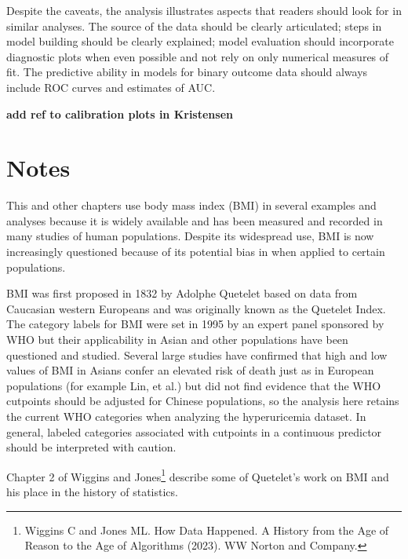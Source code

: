 Despite the caveats, the analysis illustrates aspects that readers should look for in similar analyses. The source of the data should be clearly articulated; steps in model building should be clearly explained; model evaluation should incorporate diagnostic plots when even possible and not rely on only numerical  measures of fit.  The predictive ability in models for binary outcome data should always include ROC curves and estimates of AUC.

\textbf{add ref to calibration plots in Kristensen} 



\textD{\newpage}

\section{Notes}
\label{notesLogisticRegression}

This and other chapters use body mass index (BMI) in several examples and analyses because it is widely available and has been measured and recorded in many studies of human populations. Despite its widespread use, BMI is now increasingly questioned because of its potential bias in when applied to certain populations.

BMI was first proposed in 1832 by Adolphe Quetelet based on data from Caucasian western Europeans and was originally known as the Quetelet Index. The category labels for BMI were set in 1995 by an expert panel sponsored by WHO but their applicability in Asian and other populations have been questioned and studied.  Several large studies have confirmed that high and low values of BMI in Asians confer an elevated risk of death just as in European populations (for example Lin, et al.) but did not find evidence that the WHO cutpoints should be adjusted for Chinese populations, so the analysis here retains the current WHO categories when analyzing the hyperuricemia dataset.  In general, labeled categories associated with cutpoints in a continuous predictor should be interpreted with caution.

Chapter 2 of Wiggins and Jones\footnote{Wiggins C and Jones ML.  How Data Happened.  A History from the Age of Reason to the Age of Algorithms (2023).  WW Norton and Company.} describe some of Quetelet's work on BMI and his place in the history of statistics.

